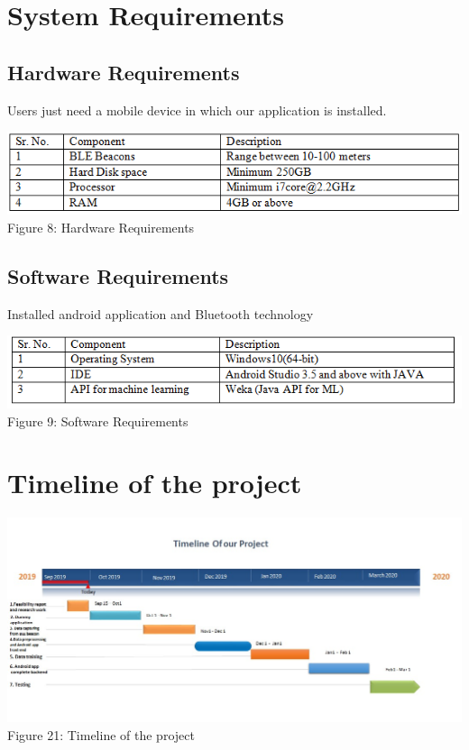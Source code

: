 \documentclass{article}
\begin{document}
\section{System Requirements}
\subsection{Hardware Requirements}
Users just need a mobile device in which our application is installed.
\begin{center}
\includegraphics[scale=0.8]{table2}
\\Figure 8: Hardware Requirements
\end{center}
\subsection{Software Requirements}
Installed android application and Bluetooth technology 

\begin{center}
\includegraphics[scale=0.8]{table1}
\\Figure 9: Software Requirements
\end{center}


\section{Timeline of the project}
\begin{center}
\includegraphics[scale=0.5]{timeline}
\\Figure 21: Timeline of the project
\end{center}
\end{document}
